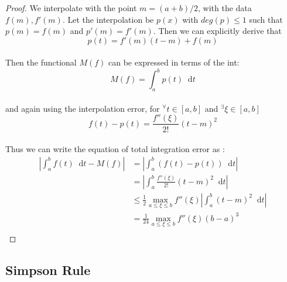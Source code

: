 \documentclass[paper=a4, fontsize=11pt]{scrartcl}
\newcommand*\dif{\mathop{}\!\mathrm{d}}
\begin{document}
\begin{proof}
	We interpolate with the point $m=(a+b)/2$, with the data $f(m),f'(m)$. Let the interpolation be $p(x)$ with $deg(p)\leq 1$ such that $p(m)=f(m)$ and $p'(m)=f'(m)$. Then we can explicitly derive that \\
	
	\begin{equation}\nonumber
		p(t)= f'(m)(t-m) + f(m)
	\end{equation}\\
	
	Then the functional $M(f)$ can be expressed in terms of the int: \\
	
	\begin{equation}\nonumber
		M(f) = \int_{a}^{b} p(t) \dif t
	\end{equation}\\
	
	and again using the interpolation error, for $^\forall t \in [a,b]$ and $^\exists \xi \in [a,b]$ \\
	
	\begin{equation}\nonumber
		f(t)-p(t) =  \frac{f''(\xi)}{2!}(t-m)^2
	\end{equation}\\
	
	Thus we can write the equation of total integration error as :\\
	
	\begin{equation}\nonumber
		\begin{split}
		\left| \int_{a}^{b} f(t) \dif t - M(f) \right| &= \left| \int_{a}^{b} (f(t) - p(t))  \dif t \right| \\[2.5ex]
		&= \left| \int_{a}^{b} \frac{f''(\xi)}{2!}(t-m)^2 \dif t \right| \\[2.5ex]
		&\leq \frac{1}{2} \max_{a\leq\xi\leq b}f''(\xi) \left| \int_{a}^{b} (t-m)^2 \dif t \right| \\[2.5ex]
		&= \frac{1}{24} \max_{a\leq\xi\leq b}f''(\xi) (b-a)^3 \\
		\end{split}
	\end{equation}
\end{proof}

\vspace{0.15in}
\subsection{Simpson Rule}
\vspace{0.15in}
\end{document}
